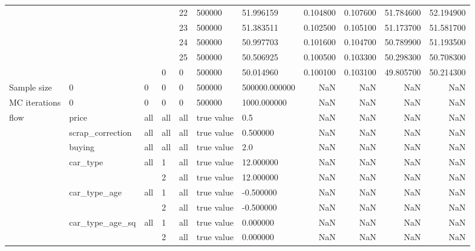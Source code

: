 \begin{tabular}{lllllllrrrr}
\cline{5-11}
 &  &  &  & 22 & 500000 & 51.996159 & 0.104800 & 0.107600 & 51.784600 & 52.194900 \\
\cline{5-11}
 &  &  &  & 23 & 500000 & 51.383511 & 0.102500 & 0.105100 & 51.173700 & 51.581700 \\
\cline{5-11}
 &  &  &  & 24 & 500000 & 50.997703 & 0.101600 & 0.104700 & 50.789900 & 51.193500 \\
\cline{5-11}
 &  &  &  & 25 & 500000 & 50.506925 & 0.100500 & 0.103300 & 50.298300 & 50.708300 \\
\cline{4-11} \cline{5-11}
 &  &  & 0 & 0 & 500000 & 50.014960 & 0.100100 & 0.103100 & 49.805700 & 50.214300 \\
\cline{1-11} \cline{2-11} \cline{3-11} \cline{4-11} \cline{5-11}
Sample size & 0 & 0 & 0 & 0 & 500000 & 500000.000000 & NaN & NaN & NaN & NaN \\
\cline{1-11} \cline{2-11} \cline{3-11} \cline{4-11} \cline{5-11}
MC iterations & 0 & 0 & 0 & 0 & 500000 & 1000.000000 & NaN & NaN & NaN & NaN \\
\cline{1-11} \cline{2-11} \cline{3-11} \cline{4-11} \cline{5-11}
\multirow[t]{11}{*}{flow} & price & all & all & all & true value & 0.5 & NaN & NaN & NaN & NaN \\
\cline{2-11} \cline{3-11} \cline{4-11} \cline{5-11}
 & scrap_correction & all & all & all & true value & 0.500000 & NaN & NaN & NaN & NaN \\
\cline{2-11} \cline{3-11} \cline{4-11} \cline{5-11}
 & buying & all & all & all & true value & 2.0 & NaN & NaN & NaN & NaN \\
\cline{2-11} \cline{3-11} \cline{4-11} \cline{5-11}
 & \multirow[t]{2}{*}{car_type} & \multirow[t]{2}{*}{all} & 1 & all & true value & 12.000000 & NaN & NaN & NaN & NaN \\
\cline{4-11} \cline{5-11}
 &  &  & 2 & all & true value & 12.000000 & NaN & NaN & NaN & NaN \\
\cline{2-11} \cline{3-11} \cline{4-11} \cline{5-11}
 & \multirow[t]{2}{*}{car_type_age} & \multirow[t]{2}{*}{all} & 1 & all & true value & -0.500000 & NaN & NaN & NaN & NaN \\
\cline{4-11} \cline{5-11}
 &  &  & 2 & all & true value & -0.500000 & NaN & NaN & NaN & NaN \\
\cline{2-11} \cline{3-11} \cline{4-11} \cline{5-11}
 & \multirow[t]{2}{*}{car_type_age_sq} & \multirow[t]{2}{*}{all} & 1 & all & true value & 0.000000 & NaN & NaN & NaN & NaN \\
\cline{4-11} \cline{5-11}
 &  &  & 2 & all & true value & 0.000000 & NaN & NaN & NaN & NaN \\

\end{tabular}
